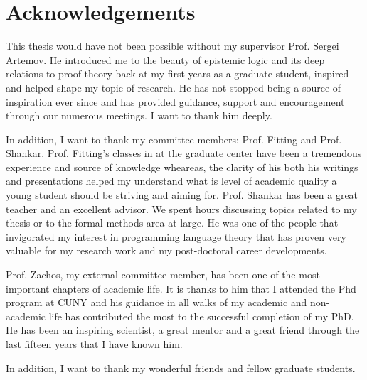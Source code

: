 \section*{Acknowledgements}
This thesis would have not been possible without my supervisor Prof. Sergei Artemov.
He introduced me to the beauty of epistemic logic and its deep relations to proof theory
back at my first years as a graduate student, inspired and helped shape my topic of research. 
He has not stopped being a source of inspiration ever
since and has provided guidance, support and encouragement through our numerous meetings. 
I want to thank him deeply.

In addition, I want to thank my committee members: Prof. Fitting and Prof. Shankar. Prof. Fitting's classes
in at the graduate center have been a tremendous experience and source of knowledge wheareas,
the clarity of his both his writings and presentations helped my understand what is 
level of academic quality a young student should be striving and aiming for. Prof. Shankar has
been a great teacher and an excellent advisor. We spent hours 
discussing topics related to my thesis or to the formal methods area at large. He was one
of the people that invigorated my interest in programming language theory that has
proven very valuable for my research work and my post-doctoral career developments.

Prof. Zachos, my external committee member, has been one of the most important
chapters of academic life. It is thanks to him that I attended the Phd program at CUNY
and his guidance in all walks of my academic and non-academic life has contributed 
the most  to the successful completion of my PhD. He has been an inspiring
scientist, a great mentor and a great friend through the last fifteen years that I have 
known him.

In addition, I want to thank my wonderful friends and fellow graduate students.
